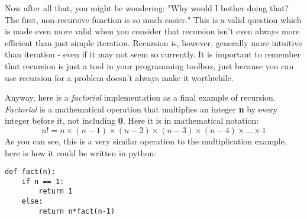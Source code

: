 \documentclass{article}
\begin{document}
Now after all that, you might be wondering: "Why would I bother doing that? The first, non-recursive function is so much easier." This is a valid question which is made even more valid when you consider that recursion isn't even always more efficient than just simple iteration. Recursion is, however, generally more intuitive than iteration - even if it may not seem so currently. It is important to remember that recursion is just a tool in your programming toolbox, just because you can use recursion for a problem doesn't always make it worthwhile. \medskip

Anyway, here is a \textit{factorial} implementation as a final example of recursion. \textit{Factorial} is a mathematical operation that multiplies an integer \textbf{n} by every integer before it, not including \textbf{0}. Here it is in mathematical notation:
\[n!=n\times(n-1)\times(n-2)\times(n-3)\times(n-4)\times...\times1 \]
As you can see, this is a very similar operation to the multiplication example, here is how it could be written in python:
\begin{verbatim}
def fact(n):
    if n == 1:
        return 1
    else:
        return n*fact(n-1)
\end{verbatim}
\end{document}
